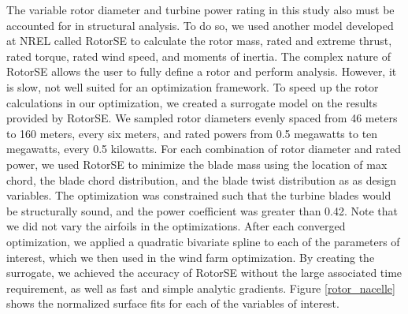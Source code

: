 The variable rotor diameter and turbine power rating in this study also must be accounted for in structural analysis.  To do so, we used another model developed at NREL called RotorSE \citep{ning2013rotorse} to calculate the rotor mass, rated and extreme thrust, rated torque, rated wind speed, and moments of inertia. The complex nature of RotorSE allows the user to fully define a rotor and perform analysis. However, it is slow, not well suited for an optimization framework. To speed up the rotor calculations in our optimization, we created a surrogate model on the results provided by RotorSE. We sampled rotor diameters evenly spaced from 46 meters to 160 meters, every six meters, and rated powers from 0.5 megawatts to ten megawatts, every 0.5 kilowatts. For each combination of rotor diameter and rated power, we used RotorSE to minimize the blade mass using the location of max chord, the blade chord distribution, and the blade twist distribution as as design variables. The optimization was constrained such that the turbine blades would be structurally sound, and the power coefficient was greater than 0.42. Note that we did not vary the airfoils in the optimizations. After each converged optimization, we applied a quadratic bivariate spline to each of the parameters of interest, which we then used in the wind farm optimization. By creating the surrogate, we achieved the accuracy of RotorSE without the large associated time requirement, as well as fast and simple analytic gradients. Figure \ref{rotor_nacelle} shows the normalized surface fits for each of the variables of interest.


